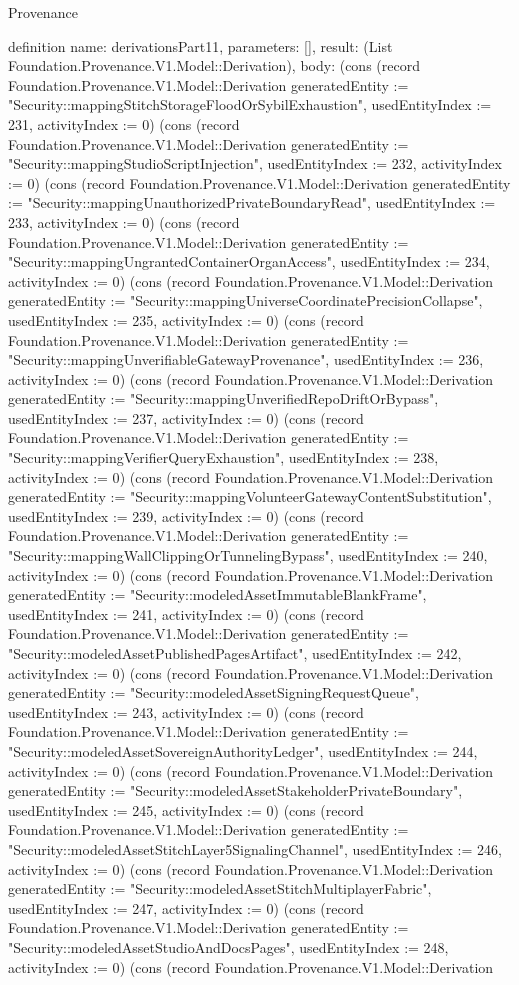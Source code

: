 \begin{lexlean}{Provenance}
\begin{semanticmodule}
definition{
  name: derivationsPart11,
  parameters: [],
  result: (List Foundation.Provenance.V1.Model::Derivation),
  body: (cons (record Foundation.Provenance.V1.Model::Derivation {generatedEntity := "Security::mappingStitchStorageFloodOrSybilExhaustion", usedEntityIndex := 231, activityIndex := 0}) (cons (record Foundation.Provenance.V1.Model::Derivation {generatedEntity := "Security::mappingStudioScriptInjection", usedEntityIndex := 232, activityIndex := 0}) (cons (record Foundation.Provenance.V1.Model::Derivation {generatedEntity := "Security::mappingUnauthorizedPrivateBoundaryRead", usedEntityIndex := 233, activityIndex := 0}) (cons (record Foundation.Provenance.V1.Model::Derivation {generatedEntity := "Security::mappingUngrantedContainerOrganAccess", usedEntityIndex := 234, activityIndex := 0}) (cons (record Foundation.Provenance.V1.Model::Derivation {generatedEntity := "Security::mappingUniverseCoordinatePrecisionCollapse", usedEntityIndex := 235, activityIndex := 0}) (cons (record Foundation.Provenance.V1.Model::Derivation {generatedEntity := "Security::mappingUnverifiableGatewayProvenance", usedEntityIndex := 236, activityIndex := 0}) (cons (record Foundation.Provenance.V1.Model::Derivation {generatedEntity := "Security::mappingUnverifiedRepoDriftOrBypass", usedEntityIndex := 237, activityIndex := 0}) (cons (record Foundation.Provenance.V1.Model::Derivation {generatedEntity := "Security::mappingVerifierQueryExhaustion", usedEntityIndex := 238, activityIndex := 0}) (cons (record Foundation.Provenance.V1.Model::Derivation {generatedEntity := "Security::mappingVolunteerGatewayContentSubstitution", usedEntityIndex := 239, activityIndex := 0}) (cons (record Foundation.Provenance.V1.Model::Derivation {generatedEntity := "Security::mappingWallClippingOrTunnelingBypass", usedEntityIndex := 240, activityIndex := 0}) (cons (record Foundation.Provenance.V1.Model::Derivation {generatedEntity := "Security::modeledAssetImmutableBlankFrame", usedEntityIndex := 241, activityIndex := 0}) (cons (record Foundation.Provenance.V1.Model::Derivation {generatedEntity := "Security::modeledAssetPublishedPagesArtifact", usedEntityIndex := 242, activityIndex := 0}) (cons (record Foundation.Provenance.V1.Model::Derivation {generatedEntity := "Security::modeledAssetSigningRequestQueue", usedEntityIndex := 243, activityIndex := 0}) (cons (record Foundation.Provenance.V1.Model::Derivation {generatedEntity := "Security::modeledAssetSovereignAuthorityLedger", usedEntityIndex := 244, activityIndex := 0}) (cons (record Foundation.Provenance.V1.Model::Derivation {generatedEntity := "Security::modeledAssetStakeholderPrivateBoundary", usedEntityIndex := 245, activityIndex := 0}) (cons (record Foundation.Provenance.V1.Model::Derivation {generatedEntity := "Security::modeledAssetStitchLayer5SignalingChannel", usedEntityIndex := 246, activityIndex := 0}) (cons (record Foundation.Provenance.V1.Model::Derivation {generatedEntity := "Security::modeledAssetStitchMultiplayerFabric", usedEntityIndex := 247, activityIndex := 0}) (cons (record Foundation.Provenance.V1.Model::Derivation {generatedEntity := "Security::modeledAssetStudioAndDocsPages", usedEntityIndex := 248, activityIndex := 0}) (cons (record Foundation.Provenance.V1.Model::Derivation }
\end{semanticmodule}
\end{lexlean}
